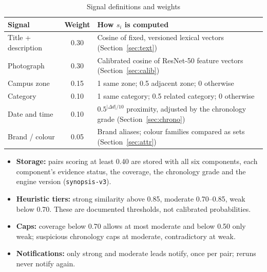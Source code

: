 \documentclass[12pt,a4paper,oneside]{report}
\newcommand{\code}[1]{\texttt{#1}}
\begin{document}
\begin{table}[H]
\centering\small
\caption{Signal definitions and weights}
\begin{tabularx}{\textwidth}{P{30mm}c X}
\toprule
Signal & Weight & How $s_i$ is computed\\
\midrule
Title + description & 0.30 & Cosine of fixed, versioned lexical vectors (Section~\ref{sec:text})\\
Photograph & 0.30 & Calibrated cosine of ResNet-50 feature vectors (Section~\ref{sec:calib})\\
Campus zone & 0.15 & 1 same zone; 0.5 adjacent zone; 0 otherwise\\
Category & 0.10 & 1 same category; 0.5 related category; 0 otherwise\\
Date and time & 0.10 & $0.5^{|\Delta d|/10}$ proximity, adjusted by the chronology grade (Section~\ref{sec:chrono})\\
Brand / colour & 0.05 & Brand aliases; colour families compared as sets (Section~\ref{sec:attr})\\
\bottomrule
\end{tabularx}
\end{table}

\begin{itemize}
  \item \textbf{Storage:} pairs scoring at least 0.40 are stored with all six components, each component's evidence status, the coverage, the chronology grade and the engine version (\code{synopsis-v3}).
  \item \textbf{Heuristic tiers:} strong similarity above 0.85, moderate 0.70--0.85, weak below 0.70. These are documented thresholds, not calibrated probabilities.
  \item \textbf{Caps:} coverage below 0.70 allows at most moderate and below 0.50 only weak; suspicious chronology caps at moderate, contradictory at weak.
  \item \textbf{Notifications:} only strong and moderate leads notify, once per pair; reruns never notify again.
\end{itemize}
\end{document}
